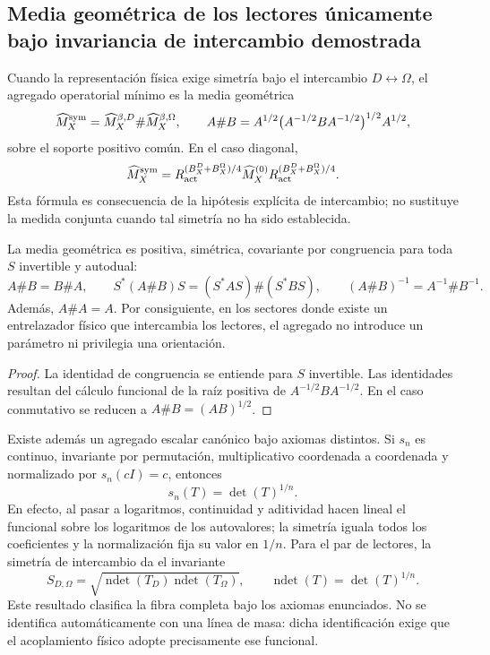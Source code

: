 \subsection{Media geométrica de los lectores únicamente bajo invariancia de intercambio demostrada}

Cuando la representación física exige simetría bajo el intercambio
\(D\leftrightarrow\Omega\), el agregado operatorial mínimo es la media
geométrica
\[
 \widehat M_X^{\rm sym}
 =\widehat M_X^{\beta,D}\#\widehat M_X^{\beta,\Omega},
 \qquad
 A\#B
 =A^{1/2}\bigl(A^{-1/2}BA^{-1/2}\bigr)^{1/2}A^{1/2},
\]
sobre el soporte positivo común. En el caso diagonal,
\[
 \widehat M_X^{\rm sym}
 =R_{\rm act}^{(B_X^D+B_X^\Omega)/4}
  \widehat M_X^{(0)}
  R_{\rm act}^{(B_X^D+B_X^\Omega)/4}.
\]
Esta fórmula es consecuencia de la hipótesis explícita de intercambio; no
sustituye la medida conjunta cuando tal simetría no ha sido establecida.

\begin{theorem}
La media geométrica es positiva, simétrica, covariante por congruencia para
toda \(S\) invertible y autodual:
\[
 A\#B=B\#A,
 \qquad
 S^*(A\#B)S=(S^*AS)\#(S^*BS),
 \qquad
 (A\#B)^{-1}=A^{-1}\#B^{-1}.
\]
Además, \(A\#A=A\). Por consiguiente, en los sectores donde existe un
entrelazador físico que intercambia los lectores, el agregado no introduce un
parámetro ni privilegia una orientación.
\end{theorem}

\begin{proof}
La identidad de congruencia se entiende para \(S\) invertible. Las identidades
resultan del cálculo funcional de la raíz positiva de
\(A^{-1/2}BA^{-1/2}\). En el caso conmutativo se reducen a
\(A\#B=(AB)^{1/2}\).
\end{proof}

Existe además un agregado escalar canónico bajo axiomas distintos. Si
\(s_n\) es continuo, invariante por permutación, multiplicativo coordenada a
coordenada y normalizado por \(s_n(cI)=c\), entonces
\[
 s_n(T)=\det(T)^{1/n}.
\]
En efecto, al pasar a logaritmos, continuidad y aditividad hacen lineal el
funcional sobre los logaritmos de los autovalores; la simetría iguala todos
los coeficientes y la normalización fija su valor en \(1/n\). Para el par de
lectores, la simetría de intercambio da el invariante
\[
 S_{D,\Omega}
 =\sqrt{
 \operatorname{ndet}(T_D)\operatorname{ndet}(T_\Omega)},
 \qquad
 \operatorname{ndet}(T)=\det(T)^{1/n}.
\]
Este resultado clasifica la fibra completa bajo los axiomas enunciados. No se
identifica automáticamente con una línea de masa: dicha identificación exige
que el acoplamiento físico adopte precisamente ese funcional.

